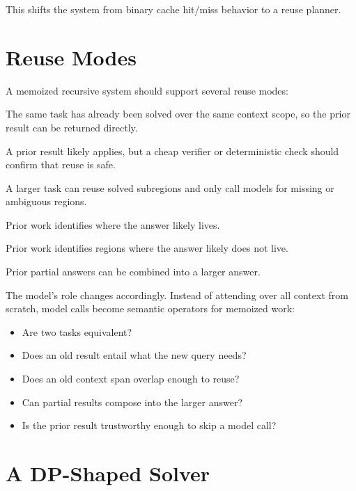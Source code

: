 \documentclass[11pt]{article}
\begin{document}
This shifts the system from binary cache hit/miss behavior to a reuse planner.

\section{Reuse Modes}

A memoized recursive system should support several reuse modes:

\begin{description}[leftmargin=1.25in,style=nextline]
    \item[Replay.] The same task has already been solved over the same context
    scope, so the prior result can be returned directly.

    \item[Verify.] A prior result likely applies, but a cheap verifier or
    deterministic check should confirm that reuse is safe.

    \item[Compose.] A larger task can reuse solved subregions and only call
    models for missing or ambiguous regions.

    \item[Narrow.] Prior work identifies where the answer likely lives.

    \item[Rule out.] Prior work identifies regions where the answer likely
    does not live.

    \item[Aggregate.] Prior partial answers can be combined into a larger
    answer.
\end{description}

The model's role changes accordingly. Instead of attending over all context
from scratch, model calls become semantic operators for memoized work:

\begin{itemize}[leftmargin=*]
    \item Are two tasks equivalent?
    \item Does an old result entail what the new query needs?
    \item Does an old context span overlap enough to reuse?
    \item Can partial results compose into the larger answer?
    \item Is the prior result trustworthy enough to skip a model call?
\end{itemize}

\section{A DP-Shaped Solver}
\end{document}

